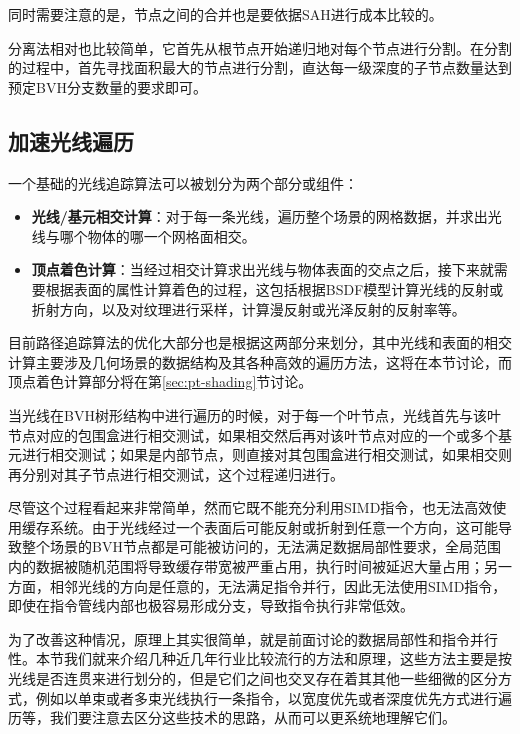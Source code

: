 同时需要注意的是，节点之间的合并也是要依据SAH进行成本比较的。

分离法相对也比较简单，它首先从根节点开始递归地对每个节点进行分割。在分割的过程中，首先寻找面积最大的节点进行分割，直达每一级深度的子节点数量达到预定BVH分支数量的要求即可。








\subsection{加速光线遍历}\label{sec:pt-ray-trversal}
一个基础的光线追踪算法可以被划分为两个部分或组件：

\begin{itemize}
	\item \textbf{光线/基元相交计算}：对于每一条光线，遍历整个场景的网格数据，并求出光线与哪个物体的哪一个网格面相交。
	\item \textbf{顶点着色计算}：当经过相交计算求出光线与物体表面的交点之后，接下来就需要根据表面的属性计算着色的过程，这包括根据BSDF模型计算光线的反射或折射方向，以及对纹理进行采样，计算漫反射或光泽反射的反射率等。
\end{itemize}

目前路径追踪算法的优化大部分也是根据这两部分来划分，其中光线和表面的相交计算主要涉及几何场景的数据结构及其各种高效的遍历方法，这将在本节讨论，而顶点着色计算部分将在第\ref{sec:pt-shading}节讨论。


当光线在BVH树形结构中进行遍历的时候，对于每一个叶节点，光线首先与该叶节点对应的包围盒进行相交测试，如果相交然后再对该叶节点对应的一个或多个基元进行相交测试；如果是内部节点，则直接对其包围盒进行相交测试，如果相交则再分别对其子节点进行相交测试，这个过程递归进行。

尽管这个过程看起来非常简单，然而它既不能充分利用SIMD指令，也无法高效使用缓存系统。由于光线经过一个表面后可能反射或折射到任意一个方向，这可能导致整个场景的BVH节点都是可能被访问的，无法满足数据局部性要求，全局范围内的数据被随机范围将导致缓存带宽被严重占用，执行时间被延迟大量占用；另一方面，相邻光线的方向是任意的，无法满足指令并行，因此无法使用SIMD指令，即使在指令管线内部也极容易形成分支，导致指令执行非常低效。

 为了改善这种情况，原理上其实很简单，就是前面讨论的数据局部性和指令并行性。本节我们就来介绍几种近几年行业比较流行的方法和原理，这些方法主要是按光线是否连贯来进行划分的，但是它们之间也交叉存在着其其他一些细微的区分方式，例如以单束或者多束光线执行一条指令，以宽度优先或者深度优先方式进行遍历等，我们要注意去区分这些技术的思路，从而可以更系统地理解它们。






